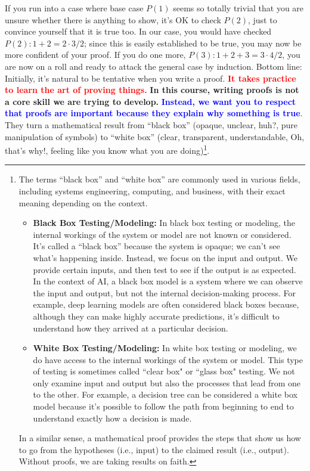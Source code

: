 \begin{rem}
If you run into a case where base case $P(1)$ seems so totally trivial that you are unsure whether there is anything to show, it's OK to check $P(2)$, just to convince yourself that it is true too. In our case, you would have checked $P(2): 1 + 2 = 2 \cdot3/2 $; since this is easily established to be true, you may now be more confident of your proof. If you do one more, $P(3): 1 + 2 + 3 = 3\cdot 4/2$, you are now on a roll and ready to attack the general case by induction. Bottom line: Initially, it's natural to be tentative when you write a proof. \textcolor{red}{\bf It takes practice to learn the art of proving things.} \textbf{In this course, writing proofs is not a core skill we are trying to develop.} \textcolor{blue}{\bf Instead, we want you to respect that proofs are important because they explain why something is true}. They turn a mathematical result from  ``black box'' (opaque, unclear, huh?, pure manipulation of symbols) to ``white box'' (clear, transparent, understandable, Oh, that's why!, feeling like you know what you are doing)\footnote{The terms ``black box'' and ``white box'' are commonly used in various fields, including systems engineering, computing, and business, with their exact meaning depending on the context. 

\begin{itemize} 

\item \textbf{Black Box Testing/Modeling:} In black box testing or modeling, the internal workings of the system or model are not known or considered. It's called a ``black box'' because the system is opaque; we can't see what's happening inside. Instead, we focus on the input and output. We provide certain inputs, and then test to see if the output is as expected. In the context of AI, a black box model is a system where we can observe the input and output, but not the internal decision-making process. For example, deep learning models are often considered black boxes because, although they can make highly accurate predictions, it's difficult to understand how they arrived at a particular decision.

\item \textbf{White Box Testing/Modeling:} In white box testing or modeling, we do have access to the internal workings of the system or model. This type of testing is sometimes called ``clear box" or ``glass box" testing. We not only examine input and output but also the processes that lead from one to the other. For example, a decision tree can be considered a white box model because it's possible to follow the path from beginning to end to understand exactly how a decision is made.
\end{itemize}
In a similar sense, a mathematical proof provides the steps that show us how to go from the hypotheses (i.e., input) to the claimed result (i.e., output). Without proofs, we are taking results on faith.
}. 
\end{rem} 


